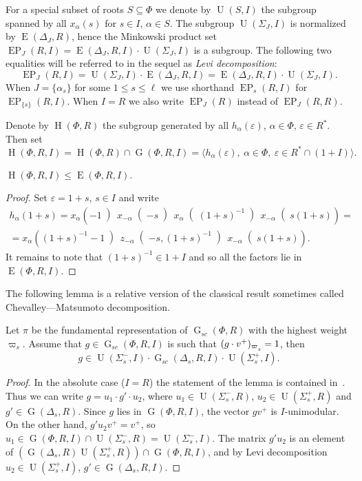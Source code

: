 \documentclass[12pt]{amsart}
\numberwithin{equation}{section}
\theoremstyle{definition}
\DeclareMathOperator{\G}{G}
\DeclareMathOperator{\E}{E}
\DeclareMathOperator{\EP}{EP}
\DeclareMathOperator{\Hh}{H}
\DeclareMathOperator{\U}{U}
\def\ssub#1{\mathchoice
   {_{\lower2pt\hbox{$\scriptstyle #1$}}}
   {_{\lower2pt\hbox{$\scriptstyle #1$}}}
   {_{\lower1.5pt\hbox{$\scriptscriptstyle #1$}}}
   {_{\!\lower1.5pt\hbox{$\scriptscriptstyle #1$}}}}
\begin{document}
For a special subset of roots $S\subseteq \Phi$ we denote by $\U(S, I)$ the subgroup spanned by all $x_{\alpha}(s)$ for $s\in I$, $\alpha\in S$.
The subgroup $\U(\Sigma_J, I)$ is normalized by $\E(\Delta_J, R)$, hence the Minkowski product set $\EP_J(R, I) = \E(\Delta_J, R, I) \cdot \U(\Sigma_J, I)$ is a subgroup. 
The following two equalities will be referred to in the sequel as {\it Levi decomposition}: 
\begin{equation} \label{rel:Levi-decomp} \EP_J(R, I) = \U(\Sigma_J, I) \cdot \E(\Delta_J, R, I) = \E(\Delta_J, R, I) \cdot \U(\Sigma_J, I). \end{equation}
When $J = \{ \alpha_s \}$ for some $1 \leq s\leq \ell$ we use shorthand $\EP_s(R, I)$ for $\EP_{\{s\}}(R, I)$.
When $I=R$ we also write $\EP_J(R)$ instead of $\EP_J(R, R)$.

Denote by $\Hh(\Phi,R)$ the subgroup generated by all $h_\alpha(\varepsilon)$, $\alpha\in\Phi$, $\varepsilon\in R^*$. Then set
\[ \Hh(\Phi,R,I) = \Hh(\Phi,R)\cap\G(\Phi,R,I)=\langle h_\alpha(\varepsilon),\ \alpha\in\Phi,\ \varepsilon\in R^*\cap(1+I)\rangle. \]
\begin{lemma}\label{lemma:rel-tor-elementary} $\Hh(\Phi,R,I)\leqslant\E(\Phi,R,I)$. \end{lemma}
\begin{proof}
Set $\varepsilon=1+s$, $s\in I$ and write
\begin{multline*}
h_\alpha(1+s) = x_\alpha\left(-1\middle)\, x_{-\alpha}\middle(-s\middle)\, x_\alpha\middle((1+s)^{-1}\middle)\, x_{-\alpha}\middle(s(1+s)\right) = \\
= x_\alpha\left((1+s)^{-1}-1\middle)\, z_{-\alpha}\middle(-s,(1+s)^{-1}\middle)\, x_{-\alpha}\middle(s(1+s)\right).
\end{multline*}
It remains to note that $(1+s)^{-1}\in 1+I$ and so all the factors lie in $\E(\Phi,R,I)$.
\end{proof}

The following lemma is a relative version of the classical result sometimes called Chevalley---Matsumoto decomposition.
\begin{lemma}\label{lemma:Chevalley-Matsumoto}
Let $\pi$ be the fundamental representation of $\G_{sc}(\Phi, R)$ with the highest weight $\varpi_s$.
Assume that $g\in \G_{sc}(\Phi, R, I)$ is such that $(g\cdot v^+)_{\varpi\ssub{s}}=1$, then 
\[ g \in \U(\Sigma_s^-, I) \cdot \G_{sc}(\Delta_s, R, I) \cdot \U(\Sigma_s^+, I). \]
\end{lemma}
\begin{proof}
In the absolute case ($I=R$) the statement of the lemma is contained in~\cite[Theorem~1.3]{St78}. 
Thus we can write $g=u_1\cdot g'\cdot u_2$, where $u_1\in\U(\Sigma_s^-,R)$, $u_2\in\U(\Sigma_s^+,R)$ and $g'\in\G(\Delta_s,R)$.
Since $g$ lies in $\G(\Phi,R,I)$, the vector $gv^+$ is $I$-unimodular. 
On the other hand, $g'u_2v^+=v^+$, so $u_1\in\G(\Phi,R,I)\cap\U(\Sigma_s^-,R)=\U(\Sigma_s^-,I)$.
The matrix $g'u_2$ is an element of $\left(\G(\Delta_s,R)\U(\Sigma_s^+,R)\right)\cap\G(\Phi,R,I)$, and by Levi decomposition $u_2\in\U(\Sigma_s^+,I)$, $g'\in\G(\Delta_s,R,I)$.
\end{proof}
\end{document}
